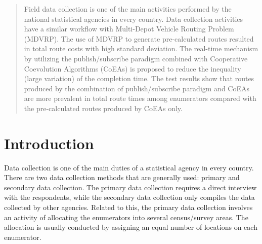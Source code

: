 \documentclass[conference]{IEEEtran}
\begin{document}




\maketitle

\begin{abstract}
Field data collection is one of the main activities performed by the national statistical agencies in every country. Data collection activities have a similar workflow with Multi-Depot Vehicle Routing Problem (MDVRP). The use of MDVRP to generate pre-calculated routes resulted in total route costs with high standard deviation. The real-time mechanism by utilizing the publish/subscribe paradigm combined with Cooperative Coevolution Algorithms (CoEAs) is proposed to reduce the inequality (large variation) of the completion time. The test results show that routes produced by the combination of publish/subscribe paradigm and CoEAs are more prevalent in total route times among enumerators compared with the pre-calculated routes produced by CoEAs only.
\end{abstract}





%
\IEEEpeerreviewmaketitle




\section{Introduction}
\label{sec:introduction}
Data collection is one of the main duties of a statistical agency in every country. There are two data collection methods that are generally used: primary and secondary data collection. The primary data collection requires a direct interview with the respondents, while the secondary data collection only compiles the data collected by other agencies. Related to this, the primary data collection involves an activity of allocating the enumerators into several census/survey areas. The allocation is usually conducted by assigning an equal number of locations on each enumerator.
\end{document}
